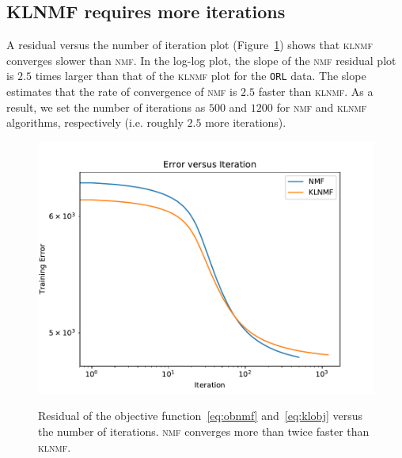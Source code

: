 \subsection{KLNMF requires more iterations}
A residual versus the number of iteration plot (Figure~\ref{error}) shows that \textsc{klnmf} converges slower than \textsc{nmf}. In the log-log plot, the slope of the \textsc{nmf} residual plot is $2.5$ times larger than that of the \textsc{klnmf} plot for the \texttt{ORL} data. The slope estimates that the rate of convergence of \textsc{nmf} is $2.5$ faster than \textsc{klnmf}. As a result, we set the number of iterations as $500$ and $1200$ for \textsc{nmf} and \textsc{klnmf} algorithms, respectively (i.e. roughly $2.5$ more iterations).
 \begin{figure}
  \centering
  \includegraphics[scale=.8]{error}\\
  \caption{Residual of the objective function~\eqref{eq:obnmf} and~\eqref{eq:klobj} versus the number of iterations. \textsc{nmf} converges more than twice faster than \textsc{klnmf}.}\label{error}
\end{figure}

